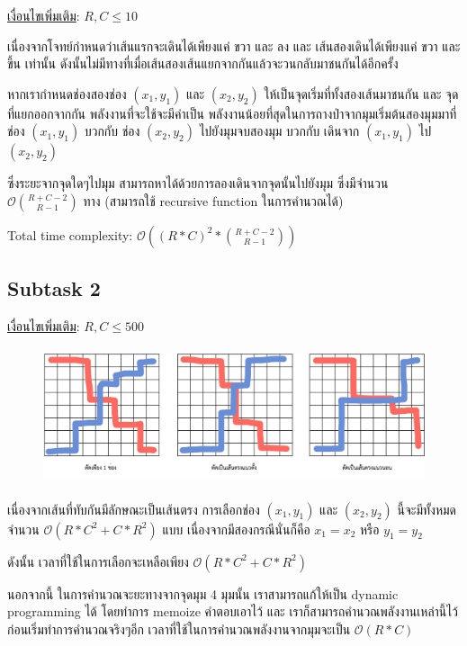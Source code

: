 \documentclass[12pt]{article}
\begin{document}
\underline{เงื่อนไขเพิ่มเติม}: $R, C \leq 10$


เนื่องจากโจทย์กำหนดว่าเส้นแรกจะเดินได้เพียงแค่ ขวา และ ลง และ เส้นสองเดินได้เพียงแค่ ขวา และ ขึ้น เท่านั้น ดังนั้นไม่มีทางที่เมื่อเส้นสองเส้นแยกจากกันแล้วจะวนกลับมาชนกันได้อีกครั้ง

หากเรากำหนดช่องสองช่อง $(x_1, y_1)$ และ $(x_2, y_2)$ ให้เป็นจุดเริ่มที่ทั้งสองเส้นมาชนกัน และ จุดที่แยกออกจากกัน พลังงานที่จะใช้จะมีค่าเป็น พลังงานน้อยที่สุดในการถางป่าจากมุมเริ่มต้นสองมุมมาที่ช่อง $(x_1, y_1)$ บวกกับ ช่อง $(x_2, y_2)$ ไปยังมุมจบสองมุม บวกกับ เดินจาก $(x_1, y_1)$ ไป $(x_2, y_2)$

ซึ่งระยะจากจุดใดๆไปมุม สามารถหาได้ด้วยการลองเดินจากจุดนั้นไปยังมุม ซึ่งมีจำนวน $\mathcal{O}{\binom{R+C-2}{R-1}}$ ทาง (สามารถใช้ recursive function ในการคำนวณได้)

Total time complexity: $\mathcal{O}((R*C)^2*\binom{R+C-2}{R-1})$

\subsection{Subtask 2}

\underline{เงื่อนไขเพิ่มเติม}: $R, C \leq 500$


\begin{figure}[h]
  \centering
  \includegraphics[height=4cm]{./images/marching2.png}
\end{figure}

เนื่องจากเส้นที่ทับกันมีลักษณะเป็นเส้นตรง การเลือกช่อง $(x_1, y_1)$ และ $(x_2, y_2)$ นี้จะมีทั้งหมด จำนวน $\mathcal{O}(R * C^2 + C * R^2)$ แบบ เนื่องจากมีสองกรณีนั่นก็คือ $x_1 = x_2$ หรือ $y_1 = y_2$

ดังนั้น เวลาที่ใช้ในการเลือกจะเหลือเพียง $\mathcal{O}(R * C^2 + C * R^2)$

นอกจากนี้ ในการคำนวณจะยะทางจากจุดมุม 4 มุมนั้น เราสามารถแก้ให้เป็น dynamic programming ได้ โดยทำการ memoize คำตอบเอาไว้ และ เราก็สามารถคำนวณพลังงานเหล่านี้ไว้ก่อนเริ่มทำการคำนวณจริงๆอีก เวลาที่ใช้ในการคำนวณพลังงานจากมุมจะเป็น $\mathcal{O}(R*C)$
\end{document}
